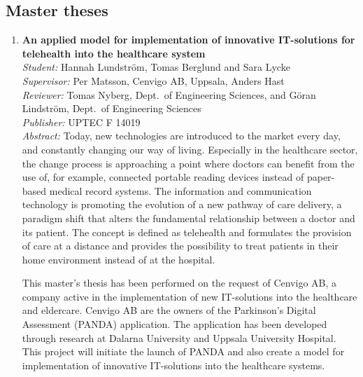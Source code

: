 %
\subsection{Master theses\label{exjobb}}
\begin{small}
\begin{enumerate}



\item\textbf{An applied model for implementation of innovative IT-solutions for telehealth into the healthcare system}\\
  \emph{Student:} Hannah Lundström, Tomas Berglund and Sara Lycke\\
  \emph{Supervisor:} Per Matsson, Cenvigo AB, Uppsala, Anders Hast \\ 
  \emph{Reviewer:} Tomas Nyberg, Dept.~of Engineering Sciences, and Göran Lindström, Dept.~of Engineering Sciences\\
  \emph{Publisher:} UPTEC F 14019\\
  \emph{Abstract:} Today, new technologies are introduced to the market every day, and constantly changing our way of living. Especially in the healthcare sector, the change process is approaching a point where doctors can benefit from the use of, for example, connected portable reading devices instead of paper-based medical record systems. The information and communication technology is promoting the evolution of a new pathway of care delivery, a paradigm shift that alters the fundamental relationship between a doctor and its patient. The concept is defined as telehealth and formulates the provision of care at a distance and provides the possibility to treat patients in their home environment instead of at the hospital.

This master’s thesis has been performed on the request of Cenvigo AB, a company active in the implementation of new IT-solutions into the healthcare and eldercare. Cenvigo AB are the owners of the Parkinson’s Digital Assessment (PANDA) application. The application has been developed through research at Dalarna University and Uppsala University Hospital.  This project will initiate the launch of PANDA and also create a model for implementation of innovative IT-solutions into the healthcare systems.


\end{enumerate}
\end{small}
